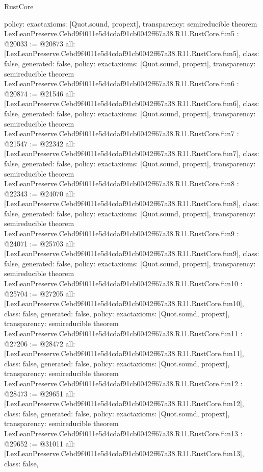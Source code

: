 \begin{lexlean}{RustCore}
\begin{coremodule}
{  policy: exact{axioms: [Quot.sound, propext]},
  transparency: semireducible
}
theorem LexLeanPreserve.Cebd9f4011e5d4cdaf91cb0042ff67a38.R11.RustCore.fun5 : @20033 := @20873 {
  all: [LexLeanPreserve.Cebd9f4011e5d4cdaf91cb0042ff67a38.R11.RustCore.fun5],
  class: false,
  generated: false,
  policy: exact{axioms: [Quot.sound, propext]},
  transparency: semireducible
}
theorem LexLeanPreserve.Cebd9f4011e5d4cdaf91cb0042ff67a38.R11.RustCore.fun6 : @20874 := @21546 {
  all: [LexLeanPreserve.Cebd9f4011e5d4cdaf91cb0042ff67a38.R11.RustCore.fun6],
  class: false,
  generated: false,
  policy: exact{axioms: [Quot.sound, propext]},
  transparency: semireducible
}
theorem LexLeanPreserve.Cebd9f4011e5d4cdaf91cb0042ff67a38.R11.RustCore.fun7 : @21547 := @22342 {
  all: [LexLeanPreserve.Cebd9f4011e5d4cdaf91cb0042ff67a38.R11.RustCore.fun7],
  class: false,
  generated: false,
  policy: exact{axioms: [Quot.sound, propext]},
  transparency: semireducible
}
theorem LexLeanPreserve.Cebd9f4011e5d4cdaf91cb0042ff67a38.R11.RustCore.fun8 : @22343 := @24070 {
  all: [LexLeanPreserve.Cebd9f4011e5d4cdaf91cb0042ff67a38.R11.RustCore.fun8],
  class: false,
  generated: false,
  policy: exact{axioms: [Quot.sound, propext]},
  transparency: semireducible
}
theorem LexLeanPreserve.Cebd9f4011e5d4cdaf91cb0042ff67a38.R11.RustCore.fun9 : @24071 := @25703 {
  all: [LexLeanPreserve.Cebd9f4011e5d4cdaf91cb0042ff67a38.R11.RustCore.fun9],
  class: false,
  generated: false,
  policy: exact{axioms: [Quot.sound, propext]},
  transparency: semireducible
}
theorem LexLeanPreserve.Cebd9f4011e5d4cdaf91cb0042ff67a38.R11.RustCore.fun10 : @25704 := @27205 {
  all: [LexLeanPreserve.Cebd9f4011e5d4cdaf91cb0042ff67a38.R11.RustCore.fun10],
  class: false,
  generated: false,
  policy: exact{axioms: [Quot.sound, propext]},
  transparency: semireducible
}
theorem LexLeanPreserve.Cebd9f4011e5d4cdaf91cb0042ff67a38.R11.RustCore.fun11 : @27206 := @28472 {
  all: [LexLeanPreserve.Cebd9f4011e5d4cdaf91cb0042ff67a38.R11.RustCore.fun11],
  class: false,
  generated: false,
  policy: exact{axioms: [Quot.sound, propext]},
  transparency: semireducible
}
theorem LexLeanPreserve.Cebd9f4011e5d4cdaf91cb0042ff67a38.R11.RustCore.fun12 : @28473 := @29651 {
  all: [LexLeanPreserve.Cebd9f4011e5d4cdaf91cb0042ff67a38.R11.RustCore.fun12],
  class: false,
  generated: false,
  policy: exact{axioms: [Quot.sound, propext]},
  transparency: semireducible
}
theorem LexLeanPreserve.Cebd9f4011e5d4cdaf91cb0042ff67a38.R11.RustCore.fun13 : @29652 := @31011 {
  all: [LexLeanPreserve.Cebd9f4011e5d4cdaf91cb0042ff67a38.R11.RustCore.fun13],
  class: false,
}
\end{coremodule}
\end{lexlean}
